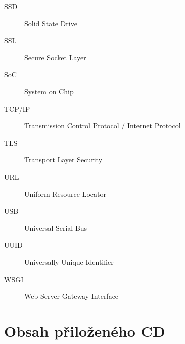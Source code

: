 \documentclass[thesis=M,czech]{templates/FITthesis}[2012/06/26]
\begin{document}
\begin{description}
    \item[SSD] Solid State Drive
    \item[SSL] Secure Socket Layer
    \item[SoC] System on Chip
    \item[TCP/IP] Transmission Control Protocol / Internet Protocol
    \item[TLS] Transport Layer Security
    \item[URL] Uniform Resource Locator
    \item[USB] Universal Serial Bus
    \item[UUID] Universally Unique Identifier
    \item[WSGI] Web Server Gateway Interface
\end{description}

\chapter{Obsah přiloženého CD}

\begin{figure}
\end{figure}
\end{document}
